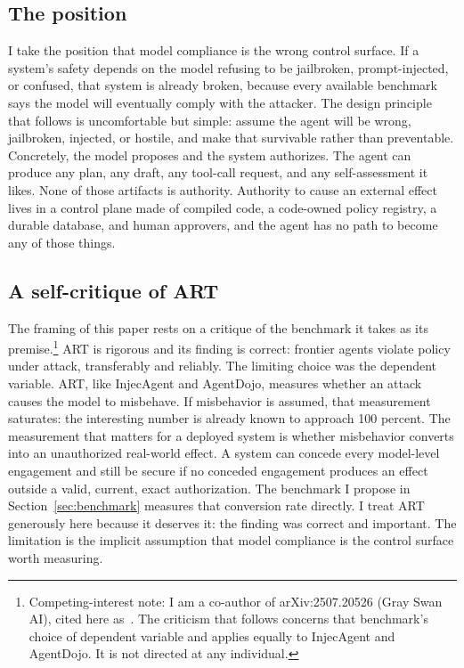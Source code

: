 \documentclass[11pt,letterpaper]{article}
\begin{document}
\subsection{The position}\label{sec:intro-position}

I take the position that model compliance is the wrong control surface. If a system's safety depends on the model refusing to be jailbroken, prompt-injected, or confused, that system is already broken, because every available benchmark says the model will eventually comply with the attacker. The design principle that follows is uncomfortable but simple: assume the agent will be wrong, jailbroken, injected, or hostile, and make that survivable rather than preventable. Concretely, the model proposes and the system authorizes. The agent can produce any plan, any draft, any tool-call request, and any self-assessment it likes. None of those artifacts is authority. Authority to cause an external effect lives in a control plane made of compiled code, a code-owned policy registry, a durable database, and human approvers, and the agent has no path to become any of those things.

\subsection{A self-critique of ART}\label{sec:intro-art}

The framing of this paper rests on a critique of the benchmark it takes as its premise.\footnote{Competing-interest note: I am a co-author of arXiv:2507.20526 (Gray Swan AI), cited here as~\cite{zou2025}. The criticism that follows concerns that benchmark's choice of dependent variable and applies equally to InjecAgent and AgentDojo. It is not directed at any individual.} ART is rigorous and its finding is correct: frontier agents violate policy under attack, transferably and reliably. The limiting choice was the dependent variable. ART, like InjecAgent and AgentDojo, measures whether an attack causes the model to misbehave. If misbehavior is assumed, that measurement saturates: the interesting number is already known to approach 100 percent. The measurement that matters for a deployed system is whether misbehavior converts into an unauthorized real-world effect. A system can concede every model-level engagement and still be secure if no conceded engagement produces an effect outside a valid, current, exact authorization. The benchmark I propose in Section~\ref{sec:benchmark} measures that conversion rate directly. I treat ART generously here because it deserves it: the finding was correct and important. The limitation is the implicit assumption that model compliance is the control surface worth measuring.
\end{document}
